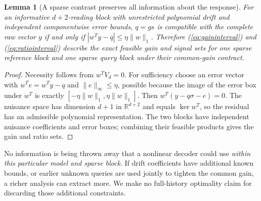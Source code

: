 \documentclass[11pt,letterpaper]{article}
\newcommand{\RR}{\mathbb R}\newcommand{\NN}{\mathbb N}
\newcommand{\norm}[1]{\lVert#1\rVert}
\newtheorem{lemma}[theorem]{Lemma}
\theoremstyle{definition}\newtheorem{definition}[theorem]{Definition}
\theoremstyle{remark}\newtheorem{remark}[theorem]{Remark}
\begin{document}
\begin{lemma}[A sparse contrast preserves all information about the response]
\label{lem:sufficient}
For an informative $d+2$-reading block with unrestricted polynomial drift and independent componentwise error bounds, $q=gs$ is compatible with the complete raw vector $y$ if and only if $|w^Ty-q|\le\eta\norm{w}_1$. Therefore (\ref{eq:gaininterval}) and (\ref{eq:ratiointerval}) describe the exact feasible gain and signal sets for one sparse reference block and one sparse query block under their common-gain contract.
\end{lemma}
\begin{proof}
Necessity follows from $w^TV_d=0$. For sufficiency choose an error vector with $w^Te=w^Ty-q$ and $\norm{e}_\infty\le\eta$, possible because the image of the error box under $w^T$ is exactly $[-\eta\norm{w}_1,\eta\norm{w}_1]$. Then $w^T(y-q\sigma-e)=0$. The nuisance space has dimension $d+1$ in $\RR^{d+2}$ and equals $\ker w^T$, so the residual has an admissible polynomial representation. The two blocks have independent nuisance coefficients and error boxes; combining their feasible products gives the gain and ratio sets.
\end{proof}

No information is being thrown away that a nonlinear decoder could use \emph{within this particular model and sparse block}. If drift coefficients have additional known bounds, or earlier unknown queries are used jointly to tighten the common gain, a richer analysis can extract more. We make no full-history optimality claim for discarding those additional constraints.
\end{document}
